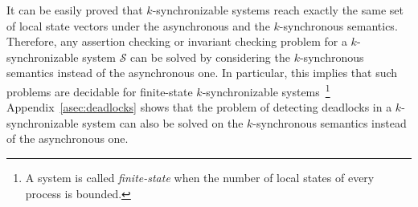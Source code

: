 It can be easily proved that $k$-synchronizable systems reach exactly the same set of local state vectors under the asynchronous and the $k$-synchronous semantics. Therefore, any assertion checking or invariant checking problem for a $k$-synchronizable system $\mathcal{S}$ can be solved by considering the $k$-synchronous semantics instead of the asynchronous one. 
In particular, this implies that such problems are decidable for finite-state $k$-synchronizable systems~\footnote{A system is called \emph{finite-state} when the number of local states of every process is bounded.} 
%
Appendix~\ref{asec:deadlocks} shows that the problem of detecting deadlocks in a $k$-synchronizable system can also be solved on the $k$-synchronous semantics instead of the asynchronous one.

\vspace{-1mm}
